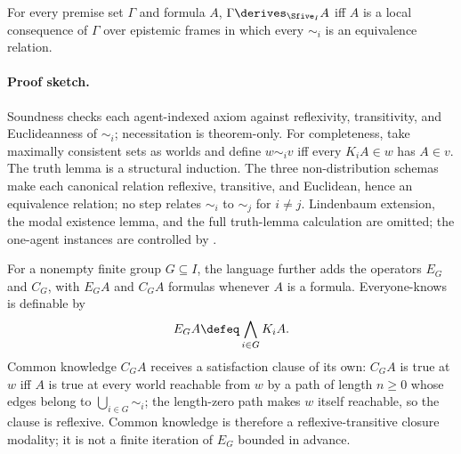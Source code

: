 \begin{theorem}
For every premise set \(\Gamma\) and formula \(A\),
\(\Gamma\derives_{\Sfive_I}A\) iff \(A\) is a local consequence of
\(\Gamma\) over epistemic frames in which every \(\sim_i\) is an equivalence
relation.
\end{theorem}

\paragraph{Proof sketch.}
Soundness checks each agent-indexed axiom against
reflexivity, transitivity, and Euclideanness of \(\sim_i\); necessitation is
theorem-only.  For completeness, take maximally consistent sets as worlds and
define \(w\sim_i v\) iff every \(K_iA\in w\) has \(A\in v\).  The
truth lemma is a structural induction.  The three non-distribution schemas
make each canonical relation reflexive, transitive, and Euclidean, hence an
equivalence relation; no step relates \(\sim_i\) to \(\sim_j\) for
\(i\ne j\).  Lindenbaum extension, the modal existence lemma, and the full
truth-lemma calculation are omitted; the one-agent instances are controlled by
\cite[Chapter 4]{BlackburnDeRijkeVenema2001}.

For a nonempty finite group \(G\subseteq I\), the language further adds the
operators \(E_G\) and \(C_G\), with \(E_GA\) and \(C_GA\) formulas
whenever \(A\) is a formula.  Everyone-knows is definable by
\[
  E_GA\defeq\bigwedge_{i\in G}K_iA.
\]
Common knowledge \(C_GA\) receives a satisfaction clause of its own:
\(C_GA\) is true at \(w\) iff \(A\) is true at every world reachable
from \(w\) by a path of length \(n\geq0\) whose edges belong to
\(\bigcup_{i\in G}\sim_i\); the length-zero path makes \(w\) itself
reachable, so the clause is reflexive.  Common knowledge is therefore a
reflexive-transitive closure modality; it is not a finite iteration of
\(E_G\) bounded in advance.
